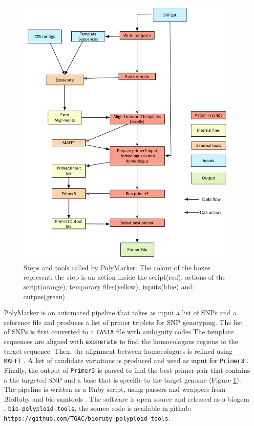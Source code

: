 \begin{figure}
\includegraphics[width=1\textwidth]{PolyMarker/Figures/pipeline.pdf}
        \caption{Steps and tools called by PolyMarker. The colour of the boxes represent: the step is an action inside the script(red); actions of the script(orange); temporary files(yellow); inputs(blue) and; outpus(green)}
        \label{fig:poly:pipeline}
\end{figure}

PolyMarker is an automated pipeline that takes as input a list of SNPs and a reference file and produces a list of primer triplets for SNP genotyping. 
The list of SNPs is first converted to a \verb|FASTA| file with ambiguity codes \citep{Cornish-Bowden1985} 
The template sequences are aligned with \verb|exonerate| \citep{Slater2005}  to find the homoeologous regions to the target sequence. 
Then, the alignment between homoeologues is refined using \verb|MAFFT| \citep{Katoh2013}. 
A list of candidate variations is produced and used as input for \verb|Primer3| \citep{Rozen}. 
Finally, the output of \verb|Primer3| is parsed to find the best primer pair that contains a the targeted SNP and a base that is specific to the target genome (Figure \ref{fig:poly:pipeline}).  
The pipeline is written as a Ruby script, using parsers and wrappers from BioRuby \citep{Goto2010} and bio-samtools \citep{Etherington2015,Ramirez-Gonzalez2012}. 
The software is open source and released as a biogem \citep{Bonnal2012}, \verb|bio-polyploid-tools|, the source code is available in github: \verb|https://github.com/TGAC/bioruby-polyploid-tools|.


